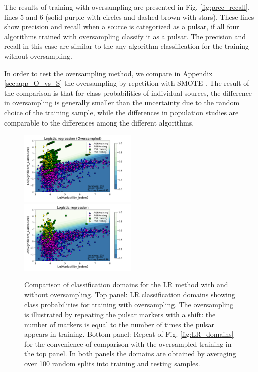 \documentclass[referee]{aa} %
\begin{document}
The results of training with oversampling are presented  in Fig. \ref{fig:prec_recall},
lines 5 and 6 (solid purple with circles and dashed brown with stars). 
These lines show precision and recall when a source is categorized as a pulsar, if all four algorithms trained with oversampling classify it as a pulsar. The precision and recall in this case are similar to the any-algorithm classification for the training without oversampling.

In order to test the oversampling method, we compare in Appendix \ref{sec:app_O_vs_S} the oversampling-by-repetition with SMOTE \citep{Chawla_2002}. The result of the comparison is that for class probabilities of individual sources, the difference in oversampling is generally smaller than the uncertainty due to the random choice of the training sample, while the differences in population studies are comparable to the differences among the different algorithms.


\begin{figure}[h]
\centering
\includegraphics[width=0.5\textwidth]{plots/classification_domains/lr_200_lbfgs_oversample.pdf} \\
\includegraphics[width=0.5\textwidth]{plots/classification_domains/lr_200_lbfgs.pdf}
\caption{%
Comparison of classification domains for the LR method with and without oversampling.
Top panel: LR classification domains showing class probabilities for training with oversampling.
The oversampling is illustrated by repeating the pulsar markers with a shift: the number of markers is equal to the number of times the pulsar appears in training.
Bottom panel: Repeat of Fig. \ref{fig:LR_domains} for the convenience of comparison with the oversampled training in the top panel.
In both panels the domains are obtained by averaging over 100 random splits into training and testing samples.
}  
\label{fig:LR_domains_O}
\end{figure}
\end{document}
